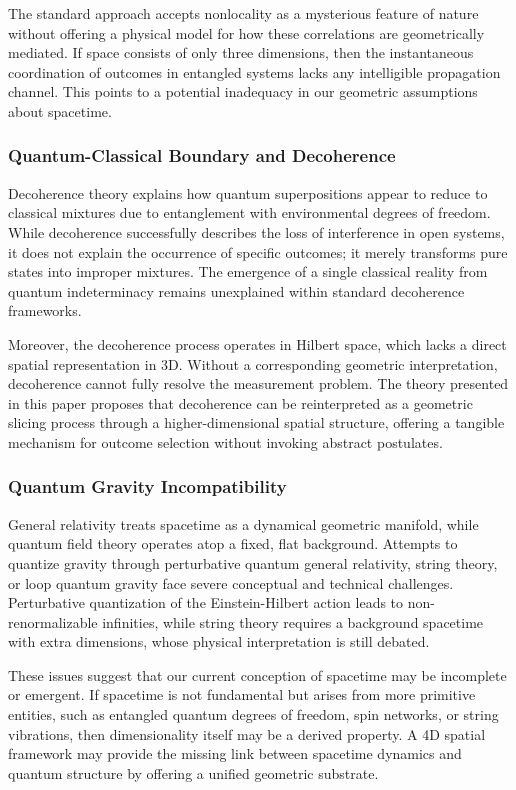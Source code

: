 \documentclass[12pt]{article}
\begin{document}
The standard approach accepts nonlocality as a mysterious feature of nature without offering a physical model for how these correlations are geometrically mediated. If space consists of only three dimensions, then the instantaneous coordination of outcomes in entangled systems lacks any intelligible propagation channel. This points to a potential inadequacy in our geometric assumptions about spacetime.

\subsubsection*{Quantum-Classical Boundary and Decoherence}

Decoherence theory explains how quantum superpositions appear to reduce to classical mixtures due to entanglement with environmental degrees of freedom. While decoherence successfully describes the loss of interference in open systems, it does not explain the occurrence of specific outcomes; it merely transforms pure states into improper mixtures. The emergence of a single classical reality from quantum indeterminacy remains unexplained within standard decoherence frameworks.

Moreover, the decoherence process operates in Hilbert space, which lacks a direct spatial representation in 3D. Without a corresponding geometric interpretation, decoherence cannot fully resolve the measurement problem. The theory presented in this paper proposes that decoherence can be reinterpreted as a geometric slicing process through a higher-dimensional spatial structure, offering a tangible mechanism for outcome selection without invoking abstract postulates.

\subsubsection*{Quantum Gravity Incompatibility}

General relativity treats spacetime as a dynamical geometric manifold, while quantum field theory operates atop a fixed, flat background. Attempts to quantize gravity through perturbative quantum general relativity, string theory, or loop quantum gravity face severe conceptual and technical challenges. Perturbative quantization of the Einstein-Hilbert action leads to non-renormalizable infinities, while string theory requires a background spacetime with extra dimensions, whose physical interpretation is still debated.

These issues suggest that our current conception of spacetime may be incomplete or emergent. If spacetime is not fundamental but arises from more primitive entities, such as entangled quantum degrees of freedom, spin networks, or string vibrations, then dimensionality itself may be a derived property. A 4D spatial framework may provide the missing link between spacetime dynamics and quantum structure by offering a unified geometric substrate.
\end{document}
